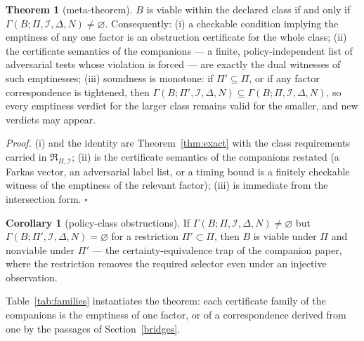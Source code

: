 \documentclass[10pt,twocolumn]{article}
\theoremstyle{definition}
\newtheorem{theorem}{Theorem}
\newtheorem{corollary}{Corollary}
\begin{document}
\begin{theorem}[meta-theorem]\label{thm:meta}
\(B\) is viable within the declared class if and only if
\(\Gamma(B; \Pi, \mathcal{I}, \Delta, N) \neq \varnothing\). Consequently:
(i) a checkable condition implying the emptiness of any one factor is an
obstruction certificate for the whole class;
(ii) the certificate semantics of the companions --- a finite,
policy-independent list of adversarial tests whose violation is forced ---
are exactly the dual witnesses of such emptinesses;
(iii) soundness is monotone: if \(\Pi' \subseteq \Pi\), or if any factor
correspondence is tightened, then
\(\Gamma(B; \Pi', \mathcal{I}, \Delta, N) \subseteq \Gamma(B; \Pi,
\mathcal{I}, \Delta, N)\), so every emptiness verdict for the larger class
remains valid for the smaller, and new verdicts may appear.
\end{theorem}

\emph{Proof.} (i) and the identity are Theorem~\ref{thm:exact} with the
class requirements carried in \(\mathfrak{R}_{\Pi,\mathcal{I}}\); (ii) is
the certificate semantics of the companions restated (a Farkas vector, an
adversarial label list, or a timing bound is a finitely checkable witness of
the emptiness of the relevant factor); (iii) is immediate from the
intersection form. \hfill\(\square\)

\begin{corollary}[policy-class obstructions]\label{cor:ce}
If \(\Gamma(B; \Pi, \mathcal{I}, \Delta, N) \neq \varnothing\) but
\(\Gamma(B; \Pi', \mathcal{I}, \Delta, N) = \varnothing\) for a restriction
\(\Pi' \subset \Pi\), then \(B\) is viable under \(\Pi\) and nonviable under
\(\Pi'\) --- the certainty-equivalence trap of the companion paper, where the
restriction removes the required selector even under an injective
observation.
\end{corollary}

Table~\ref{tab:families} instantiates the theorem: each certificate family
of the companions is the emptiness of one factor, or of a correspondence
derived from one by the passages of Section~\ref{bridges}.
\end{document}
